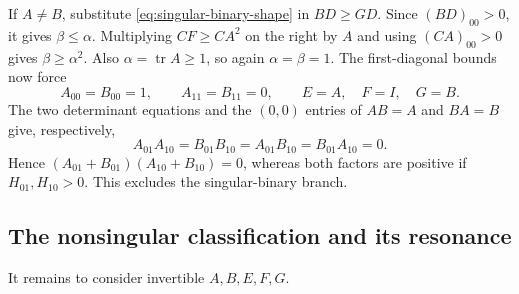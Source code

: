 \documentclass[11pt,a4paper]{article}
\newcommand{\tr}{\operatorname{tr}}
\begin{document}
If $A\ne B$, substitute \eqref{eq:singular-binary-shape} in $BD\ge GD$.
Since $(BD)_{00}>0$, it gives $\beta\le\alpha$.
Multiplying $CF\ge CA^2$ on the right by $A$ and using
$(CA)_{00}>0$ gives $\beta\ge\alpha^2$.
Also $\alpha=\tr A\ge1$, so again $\alpha=\beta=1$.
The first-diagonal bounds now force
\[
A_{00}=B_{00}=1,\qquad A_{11}=B_{11}=0,
\qquad E=A,\quad F=I,\quad G=B.
\]
The two determinant equations and the $(0,0)$ entries of $AB=A$ and
$BA=B$ give, respectively,
\[
A_{01}A_{10}=B_{01}B_{10}=A_{01}B_{10}=B_{01}A_{10}=0.
\]
Hence $(A_{01}+B_{01})(A_{10}+B_{10})=0$, whereas both factors are
positive if $H_{01},H_{10}>0$. This excludes the singular-binary branch.

\subsection{The nonsingular classification and its resonance}
It remains to consider invertible $A,B,E,F,G$.
\end{document}
